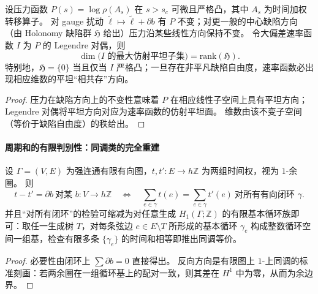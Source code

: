 \begin{proposition}\label{prop:xi-defect-rank-controls-ldp-flatness}
设压力函数 \(P(s)=\log\rho(A_s)\) 在 \(s>s_c\) 可微且严格凸，其中 \(A_s\) 为时间加权转移算子。
对 gauge 扰动 \(\widetilde{\ell}\mapsto \widetilde{\ell}+\partial b\) 有 \(P\) 不变；对更一般的中心缺陷方向（由 Holonomy 缺陷群 \(\mathfrak H\) 给出）压力沿某些线性方向保持不变。
令大偏差速率函数 \(I\) 为 \(P\) 的 Legendre 对偶，则
\[
\dim\bigl(\text{\(I\) 的最大仿射平坦子集}\bigr)=\mathrm{rank}(\mathfrak H).
\]
特别地，\(\mathfrak H=\{0\}\) 当且仅当 \(I\) 严格凸；一旦存在非平凡缺陷自由度，速率函数必出现相应维数的平坦“相共存”方向。
\end{proposition}

\begin{proof}
压力在缺陷方向上的不变性意味着 \(P\) 在相应线性子空间上具有平坦方向；Legendre 对偶将平坦方向对应为速率函数的仿射平坦面。
维数由该不变子空间（等价于缺陷自由度）的秩给出。
\end{proof}

\paragraph{周期和的有限判别性：同调类的完全重建}

\begin{proposition}\label{prop:xi-cycle-sums-determine-time-cohomology}
设 \(\Gamma=(V,E)\) 为强连通有限有向图，\(t,t':E\to h\mathbb Z\) 为两组时间权，视为 \(1\)-余圈。
则
\[
t-t'=\partial b\ \text{对某 }b:V\to h\mathbb Z
\quad\Longleftrightarrow\quad
\sum_{e\in\gamma}t(e)=\sum_{e\in\gamma}t'(e)\ \text{对所有有向闭环 }\gamma.
\]
并且“对所有闭环”的检验可缩减为对任意生成 \(H_1(\Gamma;\mathbb Z)\) 的有限基本循环族即可：取任一生成树 \(T\)，对每条弦边 \(e\in E\setminus T\) 所形成的基本循环 \(\gamma_e\) 构成整数循环空间一组基，检查有限多条 \(\{\gamma_e\}\) 的时间和相等即推出同调等价。
\end{proposition}

\begin{proof}
必要性由闭环上 \(\sum\partial b=0\) 直接得出。
反向方向是有限图上 \(1\)-上同调的标准刻画：若两余圈在一组循环基上的配对一致，则其差在 \(H^1\) 中为零，从而为余边界。
\end{proof}
